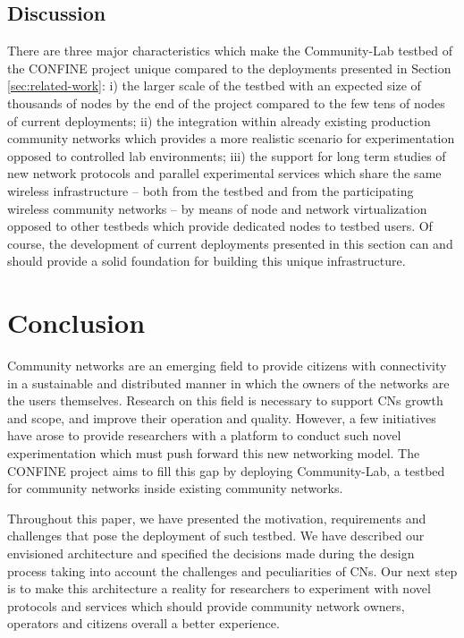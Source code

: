 \documentclass[conference]{IEEEtran}
\begin{document}
\subsection{Discussion}

There are three major characteristics which make the Community-Lab
testbed of the CONFINE project unique compared to the deployments presented in Section \ref{sec:related-work}: i) the 
larger scale of the testbed with an expected size of thousands of nodes by the end of the project compared to the few tens
of nodes of current deployments; ii) the integration within already existing production community networks which provides
a more realistic scenario for experimentation opposed to controlled lab environments; iii) the support for long term studies
of new network protocols and parallel experimental services which share the same wireless infrastructure -- both from the testbed and from the participating wireless community networks -- by means of
node and network virtualization opposed to other testbeds which provide dedicated nodes to testbed users.
Of course, the development of current deployments presented in this section can and should provide a solid foundation for building
this unique infrastructure.

\section{Conclusion}

Community networks are an emerging field to provide citizens with connectivity in a sustainable and
distributed manner in which the owners of the networks are the users themselves. Research on this field
is necessary to support CNs growth and scope, and improve their operation and quality. However, a few initiatives
have arose to provide researchers with a platform to conduct such novel experimentation which must
push forward this new networking model. The CONFINE project aims to fill this gap by deploying Community-Lab,
a testbed for community networks inside existing community networks. 

Throughout this paper, we have presented the motivation, requirements and challenges that pose the deployment
of such testbed. We have described our envisioned architecture and specified the decisions made during
the design process taking into account the challenges and peculiarities of CNs. Our next step is to make this
architecture a reality for researchers to experiment with novel protocols and services which should
provide community network owners, operators and citizens overall a better experience.
\end{document}
